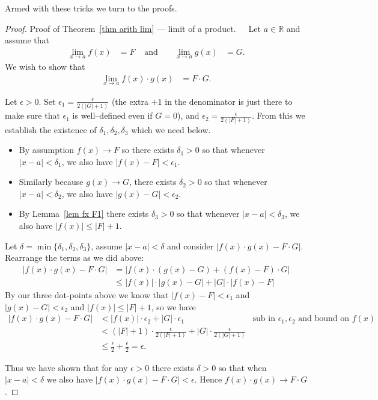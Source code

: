 \noindent
Armed with these tricks we turn to the proofs.
\begin{proof}{Proof of Theorem~\ref{thm arith lim} --- limit of a product.}\ \ \
  Let $a \in \mathbb{R}$ and assume that
\begin{align*}
  \lim_{x \to a} f(x) &= F & \text{ and } &&
  \lim_{x \to a} g(x) &= G.
\end{align*}
We wish to show that
\begin{align*}
\lim_{x \to a} f(x)\cdot g(x) &= F\cdot G.
\end{align*}

Let $\epsilon>0$. Set $\epsilon_1 = \frac{\epsilon}{2(|G|+1)}$ (the extra $+1$
in the denominator is just there to make sure that $\epsilon_1$ is well--defined even if $G=0$),
and $\epsilon_2 = \frac{\epsilon}{2(|F|+1)}$. From this we establish the
existence of $\delta_1,  \delta_2, \delta_3$ which we need below.
\begin{itemize}
 \item By assumption $f(x) \to F$ so there exists $\delta_1>0$ so that whenever
$|x-a|<\delta_1$, we also have $|f(x)-F|<\epsilon_1$.
\item Similarly because $g(x) \to G$, there exists $\delta_2>0$
so that whenever $|x-a|<\delta_2$, we also have  $|g(x)-G|<\epsilon_2$.
\item By Lemma~\ref{lem fx F1} there exists $\delta_3>0$ so that whenever
$|x-a|<\delta_3$, we also have $|f(x)| \leq |F|+1$.
\end{itemize}

Let $\delta = \min\{\delta_1, \delta_2, \delta_3 \}$, assume $|x-a|<\delta$
and consider $|f(x) \cdot g(x) - F\cdot G|$. Rearrange the terms as we did
above:
\begin{align*}
 | f(x) \cdot g(x) - F\cdot G |
  &= |f(x)\cdot( g(x)-G) + (f(x)-F)\cdot G | \\
  & \leq |f(x)| \cdot |g(x)-G| + |G| \cdot |f(x)-F|
\end{align*}
By our three dot-points above we know that $|f(x)-F|<\epsilon_1$ and
$|g(x)-G|<\epsilon_2$ and $|f(x)| \leq |F|+1$, so we have
\begin{align*}
 | f(x) \cdot g(x) - F\cdot G |
  &< |f(x)| \cdot \epsilon_2 + |G| \cdot \epsilon_1 & \text{sub in $\epsilon_1,
\epsilon_2$ and bound on $f(x)$}\\
  &< (|F|+1) \cdot \frac{\epsilon}{2(|F|+1)} + |G|\cdot\frac{\epsilon}{2(|G|+1)}\\
  &\leq  \frac{\epsilon}{2} + \frac{\epsilon}{2} = \epsilon.
\end{align*}

Thus we have shown that for any $\epsilon>0$ there exists $\delta>0$ so that
when $|x-a|<\delta$ we also have $|f(x)\cdot g(x)-F\cdot G|<\epsilon$. Hence
$f(x)\cdot g(x) \to F\cdot G$.
\end{proof}

